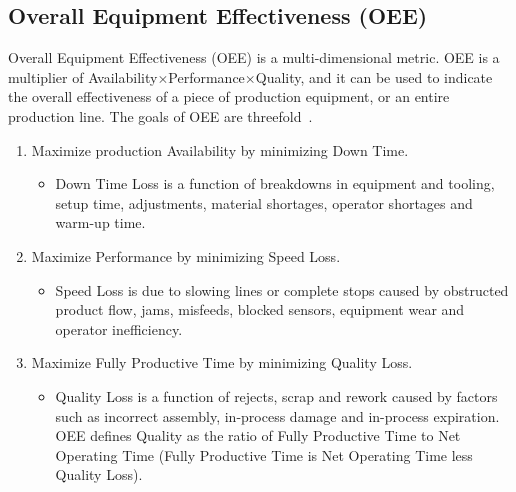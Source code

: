 \subsection{Overall Equipment Effectiveness (OEE)}
Overall Equipment Effectiveness (OEE) is a multi-dimensional metric. OEE is a multiplier of Availability$\times$Performance$\times$Quality, and it can be used to indicate the overall effectiveness of a piece of production equipment, or an entire production line. The goals of OEE are threefold~\cite{Eckstrom.WhitePaper}.
\begin{enumerate}
\item Maximize production Availability by minimizing Down Time.
\begin{itemize}
\item Down Time Loss is a function of breakdowns in equipment and tooling,
setup time, adjustments, material shortages, operator shortages and warm-up time.
\end{itemize}
\item Maximize Performance by minimizing Speed Loss.
\begin{itemize}
\item Speed Loss
is due to slowing lines or complete stops caused by obstructed product flow, jams, misfeeds,
blocked sensors, equipment wear and operator inefficiency.
\end{itemize}
\item Maximize Fully Productive Time by minimizing Quality Loss.
\begin{itemize}
\item Quality Loss is a function of rejects,
scrap and rework caused by factors such as incorrect assembly, in-process damage and in-process expiration. OEE defines Quality as the ratio of Fully Productive Time to Net Operating
Time (Fully Productive Time is Net Operating Time less Quality Loss).
\end{itemize}
\end{enumerate}

